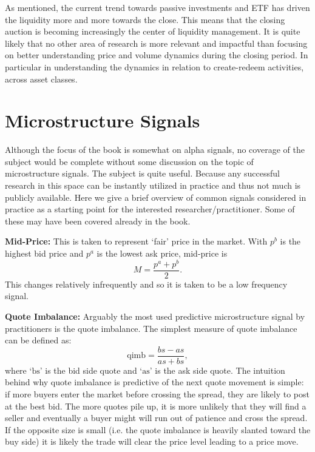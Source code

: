 As mentioned, the current trend towards passive investments and ETF has driven the liquidity more and more towards the close. This means that the closing auction is becoming increasingly the center of liquidity management.  It is quite likely that no other area of research is more relevant and impactful than focusing on better understanding price and volume dynamics during the closing period. In particular in understanding the dynamics in relation to create-redeem activities, across asset classes. \label{in:tda2}\label{in:vol_prof2}



\section{Microstructure Signals\label{sec:micro_structure_sig}}

Although the focus of the book is somewhat on alpha signals, no coverage of the subject would be complete without some discussion on the topic of microstructure signals. The subject is quite useful. Because any successful research in this space can be instantly utilized in practice and thus not much is publicly available. Here we give a brief overview of common signals considered in practice as a starting point for the interested researcher/practitioner. Some of these may have been covered already in the book. \twomedskip


\noindent\textbf{Mid-Price:} This is taken to represent `fair' price in the market. With $p^b$ is the highest bid price and $p^a$ is the lowest ask price, mid-price is
	\begin{equation} \label{eqn:mpapbover2}
	M= \dfrac{p^a + p^b}{2}.
	\end{equation}
This changes relatively infrequently and so it is taken to be a low frequency signal. \twomedskip


\noindent\textbf{Quote Imbalance:} Arguably the most used predictive microstructure signal by practitioners is the quote imbalance.  The simplest measure of quote imbalance can be defined as: 
	\begin{equation} \label{eq:q_imb}
	\text{qimb} = \frac{bs - as}{as + bs},
	\end{equation}
where `$\text{bs}$' is the bid side quote and `$\text{as}$' is the ask side quote. The intuition behind why quote imbalance is predictive of the next quote movement is simple: if more buyers enter the market before crossing the spread, they are likely to post at the best bid. The more quotes pile up, it is more unlikely that they will find a seller and eventually a buyer might will run out of patience and cross the spread. If the opposite size is small (i.e. the quote imbalance is heavily slanted toward the buy side) it is likely the trade will clear the price level leading to a price move. \twomedskip


